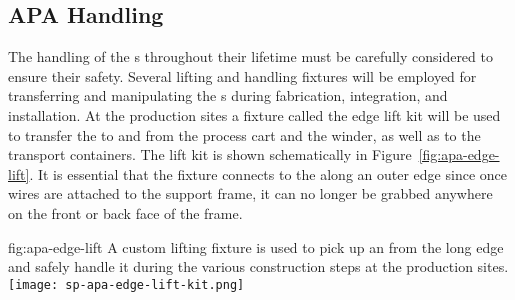 

\subsection{APA Handling}
\label{sec:fdsp-apa-transport-handling}

The handling of the s throughout their lifetime must be carefully considered to ensure their safety.  Several lifting and handling fixtures will be employed for transferring and manipulating the s during fabrication, integration, and installation.  At the production sites a fixture called the edge lift kit will be used to transfer the  to and from the process cart and the winder, as well as to the transport containers.  The lift kit is shown schematically in Figure~\ref{fig:apa-edge-lift}.  It is essential that the fixture connects to the  along an outer edge since once wires are attached to the support frame, it can no longer be grabbed anywhere on the front or back face of the frame. 

\begin{dunefigure}{fig:apa-edge-lift}
{A custom lifting fixture is used to pick up an  from the long edge and safely handle it during the various construction steps at the production sites.}  
\texttt{[image: sp-apa-edge-lift-kit.png]} 
\end{dunefigure}




